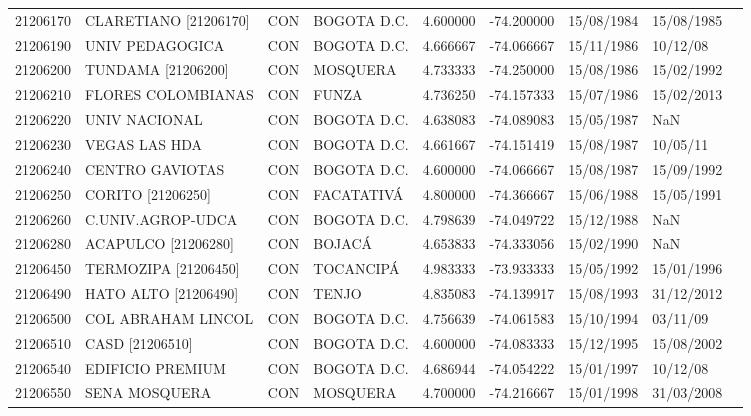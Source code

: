 \begin{landscape}
\begin{longtable}{lp{4cm}lp{3cm}lrrll}
   21206170 &       CLARETIANO [21206170] &  CON &       BOGOTA D.C. &  4.600000 & -74.200000 &  15/08/1984 &  15/08/1985 \\
   21206190 &             UNIV PEDAGOGICA &  CON &       BOGOTA D.C. &  4.666667 & -74.066667 &  15/11/1986 &    10/12/08 \\
   21206200 &          TUNDAMA [21206200] &  CON &          MOSQUERA &  4.733333 & -74.250000 &  15/08/1986 &  15/02/1992 \\
   21206210 &          FLORES COLOMBIANAS &  CON &             FUNZA &  4.736250 & -74.157333 &  15/07/1986 &  15/02/2013 \\
   21206220 &               UNIV NACIONAL &  CON &       BOGOTA D.C. &  4.638083 & -74.089083 &  15/05/1987 &         NaN \\
   21206230 &               VEGAS LAS HDA &  CON &       BOGOTA D.C. &  4.661667 & -74.151419 &  15/08/1987 &    10/05/11 \\
   21206240 &             CENTRO GAVIOTAS &  CON &       BOGOTA D.C. &  4.600000 & -74.066667 &  15/08/1987 &  15/09/1992 \\
   21206250 &           CORITO [21206250] &  CON &        FACATATIVÁ &  4.800000 & -74.366667 &  15/06/1988 &  15/05/1991 \\
   21206260 &           C.UNIV.AGROP-UDCA &  CON &       BOGOTA D.C. &  4.798639 & -74.049722 &  15/12/1988 &         NaN \\
   21206280 &         ACAPULCO [21206280] &  CON &            BOJACÁ &  4.653833 & -74.333056 &  15/02/1990 &         NaN \\
   21206450 &        TERMOZIPA [21206450] &  CON &         TOCANCIPÁ &  4.983333 & -73.933333 &  15/05/1992 &  15/01/1996 \\
   21206490 &        HATO ALTO [21206490] &  CON &             TENJO &  4.835083 & -74.139917 &  15/08/1993 &  31/12/2012 \\
   21206500 &          COL ABRAHAM LINCOL &  CON &       BOGOTA D.C. &  4.756639 & -74.061583 &  15/10/1994 &    03/11/09 \\
   21206510 &             CASD [21206510] &  CON &       BOGOTA D.C. &  4.600000 & -74.083333 &  15/12/1995 &  15/08/2002 \\
   21206540 &            EDIFICIO PREMIUM &  CON &       BOGOTA D.C. &  4.686944 & -74.054222 &  15/01/1997 &    10/12/08 \\
   21206550 &               SENA MOSQUERA &  CON &          MOSQUERA &  4.700000 & -74.216667 &  15/01/1998 &  31/03/2008 \\

\end{longtable}
\end{landscape}
